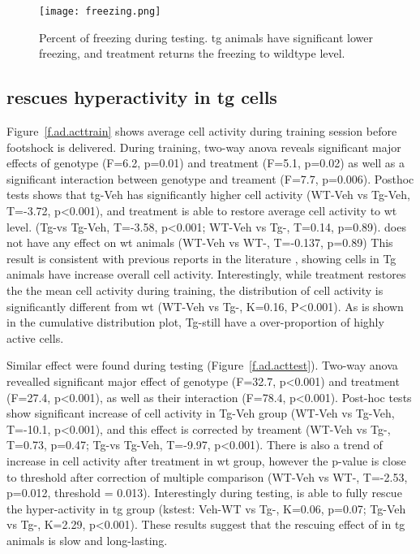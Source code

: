 \begin{figure}[h]
    \texttt{[image: freezing.png]}
    \caption{Percent of freezing during testing. \Gls{tg} animals have significant lower freezing, and \tglu treatment returns the freezing to wildtype level. \label{f.ad.freezing}}
\end{figure}



\subsection{\tglu rescues hyperactivity in \gls{tg} cells}

Figure~\ref{f.ad.acttrain} shows average cell activity during training session before footshock is delivered. During training, two-way \gls{anova} reveals significant major effects of genotype (F=6.2, p=0.01) and treatment (F=5.1, p=0.02) as well as a significant interaction between genotype and treament (F=7.7, p=0.006). Posthoc tests shows that \gls{tg}-Veh has significantly higher cell activity (WT-Veh vs Tg-Veh, T=-3.72, p<0.001), and \tglu treatment is able to restore average cell activity to \gls{wt} level. (Tg-\glu vs Tg-Veh, T=-3.58, p<0.001; WT-Veh vs Tg-\glu, T=0.14, p=0.89). \tglu does not have any effect on \gls{wt} animals (WT-Veh vs WT-\glu, T=-0.137, p=0.89) This result is consistent with previous reports in the literature \citep{verret12}, showing cells in Tg animals have increase overall cell activity. Interestingly, while \tglu treatment restores the the mean cell activity during training, the distribution of cell activity is significantly different from \gls{wt} (WT-Veh vs Tg-\glu, K=0.16, P<0.001). As is shown in the cumulative distribution plot, Tg-\glu still have a over-proportion of highly active cells. 

Similar effect were found during testing (Figure~\ref{f.ad.acttest}). Two-way \gls{anova} revealled significant major effect of genotype (F=32.7, p<0.001) and treatment (F=27.4, p<0.001), as well as their interaction (F=78.4, p<0.001). Post-hoc tests show significant increase of cell activity in Tg-Veh group (WT-Veh vs Tg-Veh, T=-10.1, p<0.001), and this effect is corrected by \tglu treament (WT-Veh vs Tg-\glu, T=0.73, p=0.47; Tg-\glu vs Tg-Veh, T=-9.97, p<0.001). There is also a trend of increase in cell activity after \tglu treatment in \gls{wt} group, however the p-value is close to threshold after correction of multiple comparison (WT-Veh vs WT-\glu, T=-2.53, p=0.012, threshold = 0.013). Interestingly during testing, \tglu is able to fully rescue the hyper-activity in \gls{tg} group (\gls{kstest}: Veh-WT vs Tg-\glu, K=0.06, p=0.07; Tg-Veh vs Tg-\glu, K=2.29, p<0.001). These results suggest that the rescuing effect of \tglu in \gls{tg} animals is slow and long-lasting.

